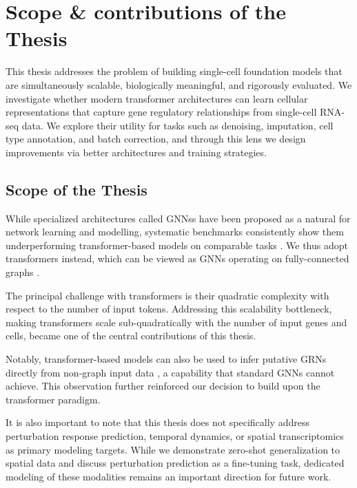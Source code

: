 \section{Scope \& contributions of the Thesis}
\label{sec:scope}

This thesis addresses the
problem of building single-cell foundation models that are simultaneously scalable, biologically
meaningful, and rigorously evaluated. We investigate whether modern transformer architectures can
learn cellular representations that capture gene regulatory relationships from single-cell
\gls{RNA-seq} data. We explore their utility for tasks such as denoising, imputation, cell type
annotation, and batch correction, and through this lens we design improvements via better
architectures and training strategies. 

\subsection{Scope of the Thesis}

While specialized architectures called \glspl{GNN}s have been proposed as a natural for network learning and modelling,
systematic benchmarks consistently show them underperforming transformer-based models on
comparable tasks \cite{hussainGlobalSelfAttentionReplacement2022,chenGraphAttentionNetwork2022}. We thus adopt transformers instead, which can be viewed as \glspl{GNN} operating on fully-connected graphs \cite{dwivediGeneralizationTransformerNetworks2021,joshiTransformersAreGraph2025,nichaniHowTransformersLearn2024a,shawSelfAttentionRelativePosition2018}.

The principal challenge with transformers is their quadratic complexity with respect to the number
of input tokens. Addressing this scalability bottleneck, making transformers scale sub-quadratically
with the number of input genes and cells, became one of the central contributions of this thesis.

Notably, transformer-based models can also be used to infer putative \glspl{GRN} directly from
non-graph input data \cite{cuiScGPTBuildingFoundation2024,theodorisTransferLearningEnables2023},
a capability that standard \glspl{GNN} cannot achieve. This observation further reinforced our
decision to build upon the transformer paradigm.

It is also important to note that this thesis does not specifically address perturbation response
prediction, temporal dynamics, or spatial transcriptomics as primary modeling targets. While we
demonstrate zero-shot generalization to spatial data and discuss perturbation prediction as a
fine-tuning task, dedicated modeling of these modalities remains an important direction for future
work.

